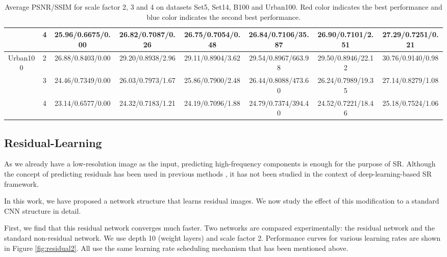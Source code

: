 \documentclass[10pt,twocolumn,letterpaper]{article}
\begin{document}
\begin{table*}
\begin{center}
\begin{tabular}{ | c | c | c | c | c | c | c | c | }
 & 4 & 25.96/0.6675/0.00 & 26.82/0.7087/{\color{blue}0.26} & 26.75/0.7054/0.48 & 26.84/{\color{blue}0.7106}/35.87 & {\color{blue}26.90}/0.7101/2.51 & {\color{red}27.29}/{\color{red}0.7251}/{\color{red}0.21}\\
\hline
\hline
\multirow{3}{*}{Urban100} & 2 & 26.88/0.8403/0.00 & 29.20/0.8938/{\color{blue}2.96} & 29.11/0.8904/3.62 & {\color{blue}29.54}/{\color{blue}0.8967}/663.98 & 29.50/0.8946/22.12 & {\color{red}30.76}/{\color{red}0.9140}/{\color{red}0.98}\\
 & 3 & 24.46/0.7349/0.00 & 26.03/0.7973/{\color{blue}1.67} & 25.86/0.7900/2.48 & {\color{blue}26.44}/{\color{blue}0.8088}/473.60 & 26.24/0.7989/19.35 & {\color{red}27.14}/{\color{red}0.8279}/{\color{red}1.08}\\
 & 4 & 23.14/0.6577/0.00 & 24.32/0.7183/{\color{blue}1.21} & 24.19/0.7096/1.88 & {\color{blue}24.79}/{\color{blue}0.7374}/394.40 & 24.52/0.7221/18.46 & {\color{red}25.18}/{\color{red}0.7524}/{\color{red}1.06}\\
\hline
\end{tabular}
\caption{Average PSNR/SSIM for scale factor 2, 3 and 4 on datasets Set5, Set14, B100 and Urban100. {\color{red}Red color} indicates the best performance and {\color{blue}blue color} indicates the second best performance.}
\label{tbl:benchmark}
\end{center}
\end{table*}


\subsection{Residual-Learning}
\label{sec:residual}

As we already have a low-resolution image as the input, predicting high-frequency components is enough for the purpose of SR. Although the concept of predicting residuals has been used in previous methods \cite{Timofte2013, Timofte,zeyde2012single}, it has not been studied in the context of deep-learning-based SR framework.

In this work, we have proposed a network structure that learns residual images. We now study the effect of this modification to a standard CNN structure in detail. 

First, we find that this residual network converges much faster. Two networks are compared experimentally: the residual network and the standard non-residual network. We use depth 10 (weight layers) and scale factor 2. Performance curves for various learning rates are shown in Figure \ref{fig:residual2}. All use the same learning rate scheduling mechanism that has been mentioned above. 
\end{document}
